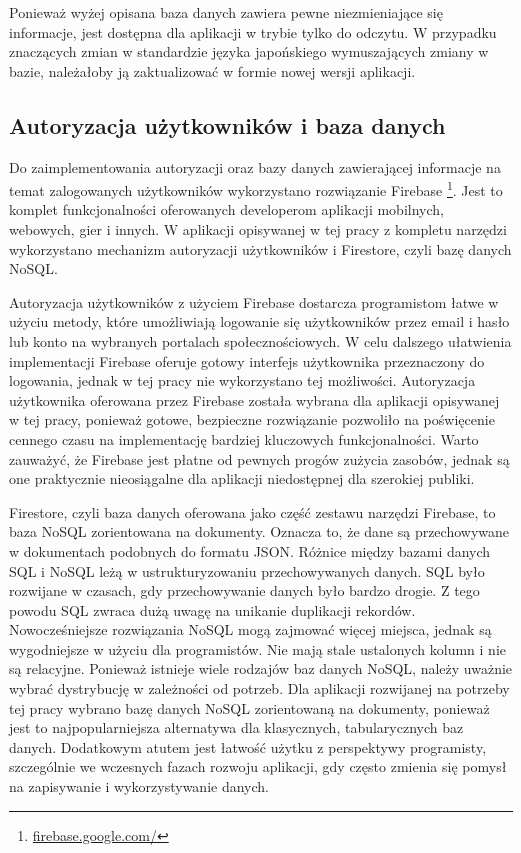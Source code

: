 \documentclass[a4paper,twoside,12pt]{book}
\begin{document}
Ponieważ wyżej opisana baza danych zawiera pewne niezmieniające się informacje, jest dostępna dla aplikacji w trybie tylko do odczytu. W przypadku znaczących zmian w standardzie języka japońskiego wymuszających zmiany w bazie, należałoby ją zaktualizować w formie nowej wersji aplikacji.

\subsection{Autoryzacja użytkowników i baza danych}
Do zaimplementowania autoryzacji oraz bazy danych zawierającej informacje na temat zalogowanych użytkowników wykorzystano rozwiązanie Firebase \footnote{\url{firebase.google.com/}}. Jest to komplet funkcjonalności oferowanych developerom aplikacji mobilnych, webowych, gier i innych. W aplikacji opisywanej w tej pracy z kompletu narzędzi wykorzystano mechanizm autoryzacji użytkowników i Firestore, czyli bazę danych NoSQL. 

Autoryzacja użytkowników z użyciem Firebase dostarcza programistom łatwe w użyciu metody, które umożliwiają logowanie się użytkowników przez email i hasło lub konto na wybranych portalach społecznościowych. W celu dalszego ułatwienia implementacji Firebase oferuje gotowy interfejs użytkownika przeznaczony do logowania, jednak w tej pracy nie wykorzystano tej możliwości. Autoryzacja użytkownika oferowana przez Firebase została wybrana dla aplikacji opisywanej w tej pracy, ponieważ gotowe, bezpieczne rozwiązanie pozwoliło na poświęcenie cennego czasu na implementację bardziej kluczowych funkcjonalności. Warto zauważyć, że Firebase jest płatne od pewnych progów zużycia zasobów, jednak są one praktycznie nieosiągalne dla aplikacji niedostępnej dla szerokiej publiki.

Firestore, czyli baza danych oferowana jako część zestawu narzędzi Firebase, to baza NoSQL zorientowana na dokumenty. Oznacza to, że dane są przechowywane w dokumentach podobnych do formatu JSON. Różnice między bazami danych SQL i NoSQL leżą w ustrukturyzowaniu przechowywanych danych. SQL było rozwijane w czasach, gdy przechowywanie danych było bardzo drogie. Z tego powodu SQL zwraca dużą uwagę na unikanie duplikacji rekordów. Nowocześniejsze rozwiązania NoSQL mogą zajmować więcej miejsca, jednak są wygodniejsze w użyciu dla programistów. Nie mają stale ustalonych kolumn i nie są relacyjne. Ponieważ istnieje wiele rodzajów baz danych NoSQL, należy uważnie wybrać dystrybucję w zależności od potrzeb. Dla aplikacji rozwijanej na potrzeby tej pracy wybrano bazę danych NoSQL zorientowaną na dokumenty, ponieważ jest to najpopularniejsza alternatywa dla klasycznych, tabularycznych baz danych. Dodatkowym atutem jest łatwość użytku z perspektywy programisty, szczególnie we wczesnych fazach rozwoju aplikacji, gdy często zmienia się pomysł na zapisywanie i wykorzystywanie danych. 
\end{document}
